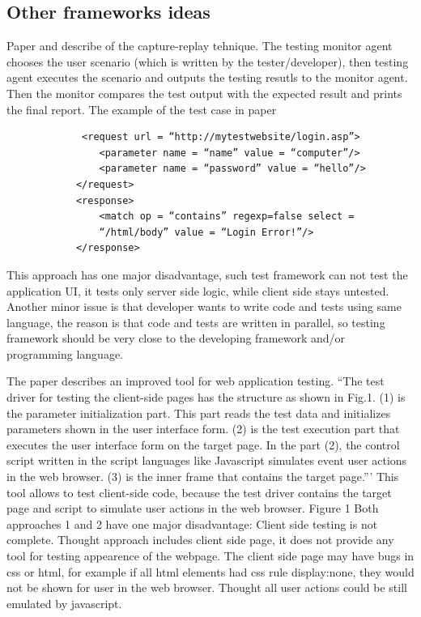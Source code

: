 \documentclass{article}
\begin{document}
   \subsection {Other frameworks ideas}
   		Paper \cite{Xu1} and \cite{Zhongen2} describe of the capture-replay
   		tehnique.
   		The testing monitor agent chooses the user scenario (which is written by the tester/developer),
   		 then testing agent executes the scenario and outputs the testing
   		 resutls to the monitor agent. Then the monitor compares the test output
   		 with the expected result and prints the final report. The example of the
   		 test case in paper \cite{Zhongen2}
   		 \begin{verbatim}
			 <request url = “http://mytestwebsite/login.asp”> 
			 	<parameter name = “name” value = “computer”/> 
			 	<parameter name = “password” value = “hello”/> 
			</request> 
			<response> 
			 	<match op = “contains” regexp=false select = 
			 	“/html/body” value = “Login Error!”/> 
			</response> 
   		 \end{verbatim}	
		This approach has one major disadvantage, such test framework can not test
		the application UI, it tests only server side logic, while client
		side stays untested. Another minor issue is that developer wants to write
		code and tests using same language, the reason is that code and tests are
		written in parallel, so testing framework should be very close to the
		developing framework and/or programming language.
		
		The paper \cite{testGen3} describes an improved tool for web application testing. 
			``The test driver for testing the client-side pages has the structure as
			shown in Fig.1. (1)  is the parameter initialization part. This part reads the test data and 
		 initializes parameters shown in the  user interface form. (2) is the test 
		 execution part that executes the  user interface form on the target 
		 page. In the part (2), the control  script written in the script 
		 languages like Javascript simulates event user actions in the web browser. (3) is the inner frame 
		 that contains the target page.'''
		  This tool allows to test client-side code, because the test driver
		  contains the target page and script to simulate user actions in the
		  web browser. 
		  				Figure 1
		Both approaches 1 and 2 have one major disadvantage:
			Client side testing is not complete. Thought approach includes client side
			page, it does not provide any tool for testing appearence of the webpage. The
			client side page may have bugs in css or html, for example if all html
			elements had css rule display:none, they would not be shown for user in the
			web browser. Thought all user actions could be still emulated by javascript.
\end{document}

